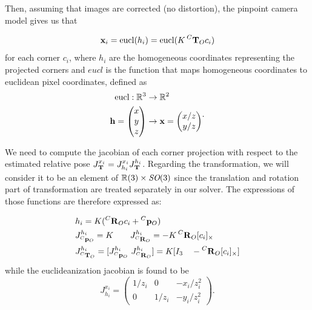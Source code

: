 Then, assuming that images are corrected (no distortion), the pinpoint camera model gives us that

\begin{equation}
    {\bf x}_i = \text{eucl}(h_i) = \text{eucl}(K\prescript{C}{}{{\bf T}}_{O} c_i)
\end{equation}
for each corner $c_i$, where $h_i$ are the homogeneous coordinates representing the projected corners and $eucl$ is the function that maps homogeneous coordinates to euclidean pixel coordinates, defined as
\begin{equation}
    \begin{split}
        \text{eucl}: \mathbb{R}^3 &\rightarrow \mathbb{R}^2 \\
        {\bf h} = \begin{pmatrix}x\\y\\z\end{pmatrix} &\rightarrow {\bf x} = \begin{pmatrix}x/z\\y/z\end{pmatrix}
    \end{split}.
\end{equation}

We need to compute the jacobian of each corner projection with respect to the estimated relative pose $J^{x_i}_{\prescript{}{}{{\bf T}}_{}} = J^{x_i}_{h_i} J^{h_i}_{\prescript{}{}{{\bf T}}_{}}$. 
Regarding the transformation, we will consider it to be an element of $\mathbb{R}(3)\times \textit{SO}(3)$ since the translation and rotation part 
of transformation are treated separately in our solver. The expressions of those functions are therefore expressed as:

\begin{equation}
    \begin{split}
        &h_i = K(\prescript{C}{}{{\bf R}}_{O}c_i + \prescript{C}{}{{\bf p}}_{O}) \\
        &J^{h_i}_{\prescript{C}{}{{\bf p}}_{O}} = K ~~~~~~ J^{h_i}_{\prescript{C}{}{{\bf R}}_{O}} = -K\prescript{C}{}{{\bf R}}_{O}[c_i]_{\times}  \\  
        &J^{h_i}_{\prescript{C}{}{{\bf T}}_{O}} = [J^{h_i}_{\prescript{C}{}{{\bf p}}_{O}} ~J^{h_i}_{\prescript{C}{}{{\bf R}}_{O}}] = K [I_3 ~~~ -\prescript{C}{}{{\bf R}}_{O} [c_i]_{\times}]
    \end{split}
\end{equation}
while the euclideanization jacobian is found to be
\begin{equation}
    J^{x_i}_{h_i}
    =
    \begin{pmatrix}
    1/z_i & 0 & -x_i/z_i^2 \\
    0 & 1/z_i & -y_i/z_i^2
    \end{pmatrix}.
\end{equation}


